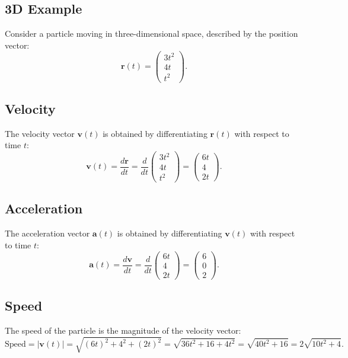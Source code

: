 \documentclass[a4paper,12pt]{article}
\begin{document}
\begin{itemize}[leftmargin=*]
\subsection{3D Example}

Consider a particle moving in three-dimensional space, described by the position vector:
\[
\mathbf{r}(t) = \begin{pmatrix} 3t^2 \\ 4t \\ t^2 \end{pmatrix}.
\]

\subsection*{Velocity}

The velocity vector \(\mathbf{v}(t)\) is obtained by differentiating \(\mathbf{r}(t)\) with respect to time \(t\):
\[
\mathbf{v}(t) = \frac{d\mathbf{r}}{dt} = \frac{d}{dt} \begin{pmatrix} 3t^2 \\ 4t \\ t^2 \end{pmatrix} = \begin{pmatrix} 6t \\ 4 \\ 2t \end{pmatrix}.
\]

\subsection*{Acceleration}

The acceleration vector \(\mathbf{a}(t)\) is obtained by differentiating \(\mathbf{v}(t)\) with respect to time \(t\):
\[
\mathbf{a}(t) = \frac{d\mathbf{v}}{dt} = \frac{d}{dt} \begin{pmatrix} 6t \\ 4 \\ 2t \end{pmatrix} = \begin{pmatrix} 6 \\ 0 \\ 2 \end{pmatrix}.
\]

\subsection*{Speed}

The speed of the particle is the magnitude of the velocity vector:
\[
\text{Speed} = |\mathbf{v}(t)| = \sqrt{(6t)^2 + 4^2 + (2t)^2} = \sqrt{36t^2 + 16 + 4t^2} = \sqrt{40t^2 + 16} = 2\sqrt{10t^2 + 4}.
\]

\end{itemize}
\end{document}
